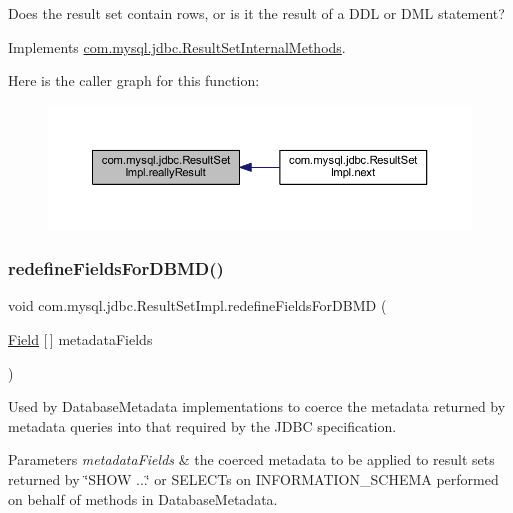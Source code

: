 Does the result set contain rows, or is it the result of a D\+DL or D\+ML statement? 

Implements \mbox{\hyperlink{interfacecom_1_1mysql_1_1jdbc_1_1_result_set_internal_methods_a3e6296e287a3c596e1d63ca2d8fe9fc5}{com.\+mysql.\+jdbc.\+Result\+Set\+Internal\+Methods}}.

Here is the caller graph for this function\+:
\nopagebreak
\begin{figure}[H]
\begin{center}
\leavevmode
\includegraphics[width=350pt]{classcom_1_1mysql_1_1jdbc_1_1_result_set_impl_aa8f663e9020bd6661b377d8314b74964_icgraph}
\end{center}
\end{figure}
\mbox{\label{classcom_1_1mysql_1_1jdbc_1_1_result_set_impl_a4fba1e8958a474ee74b88f2356c01d19}} 
\subsubsection{\texorpdfstring{redefine\+Fields\+For\+D\+B\+M\+D()}{redefineFieldsForDBMD()}}
{\footnotesize\ttfamily void com.\+mysql.\+jdbc.\+Result\+Set\+Impl.\+redefine\+Fields\+For\+D\+B\+MD (\begin{DoxyParamCaption}\item[{\mbox{\hyperlink{classcom_1_1mysql_1_1jdbc_1_1_field}{Field}} \mbox{[}$\,$\mbox{]}}]{metadata\+Fields }\end{DoxyParamCaption})}

Used by Database\+Metadata implementations to coerce the metadata returned by metadata queries into that required by the J\+D\+BC specification.


\begin{DoxyParams}{Parameters}
{\em metadata\+Fields} & the coerced metadata to be applied to result sets returned by \char`\"{}\+S\+H\+O\+W ...\char`\"{} or S\+E\+L\+E\+C\+Ts on I\+N\+F\+O\+R\+M\+A\+T\+I\+O\+N\+\_\+\+S\+C\+H\+E\+MA performed on behalf of methods in Database\+Metadata. \\
\hline
\end{DoxyParams}


